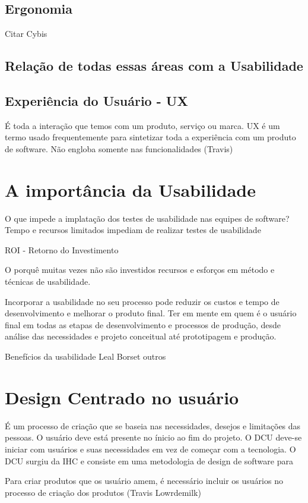 \subsection{Ergonomia}

Citar Cybis 

\subsection{Relação de todas essas áreas com a Usabilidade}

\subsection{Experiência do Usuário - UX}
É toda a interação que temos com um produto, serviço ou marca.
UX é um termo usado frequentemente para sintetizar toda a experiência com um produto de software. Não engloba  somente nas funcionalidades (Travis)



\section{A importância da Usabilidade}

O que impede a implatação dos testes de usabilidade nas equipes de software?
Tempo e recursos limitados impediam de realizar testes de usabilidade

ROI - Retorno do Investimento

O porquê muitas vezes não são investidos recursos e esforços em método e técnicas de usabilidade.

Incorporar a usabilidade no seu processo pode reduzir os custos e tempo de desenvolvimento e melhorar o produto final. Ter em mente  em quem é o usuário final em todas as etapas de desenvolvimento e processos de produção, desde análise das necessidades e projeto conceitual até prototipagem e produção. 


Benefícios da usabilidade
Leal
Borset 
outros


\section{Design Centrado no usuário}

É um processo de criação que se baseia nas necessidades, desejos e limitações das pessoas. O usuário deve está presente no ínicio ao fim do projeto.
O DCU deve-se iniciar com usuários e suas necessidades em vez de começar com a tecnologia.
O DCU surgiu da IHC e consiste em uma metodologia de design de software para 


Para criar produtos que os usuário amem, é necessário incluir os usuários no processo de criação dos produtos (Travis Lowrdemilk)

